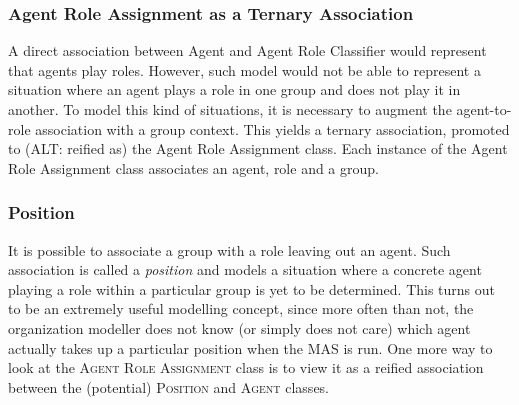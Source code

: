 \subsubsection*{Agent Role Assignment as a Ternary Association}

A direct association between Agent and Agent Role Classifier would represent that agents play roles.
However, such model would not be able to represent a situation where an agent plays a role in one group and does not play it in another.
To model this kind of situations, it is necessary to augment the agent-to-role association with a group context.
This yields a ternary association, promoted to (ALT: reified as) the Agent Role Assignment class.
Each instance of the Agent Role Assignment class associates an agent, role and a group.

\subsubsection*{Position}

It is possible to associate a group with a role leaving out an agent.
Such association is called a \textit{position} and models a situation where a concrete agent playing a role within a particular group is yet to be determined.
This turns out to be an extremely useful modelling concept, since more often than not, the organization modeller does not know (or simply does not care) which agent actually takes up a particular position when the MAS is run.
One more way to look at the \textsc{Agent Role Assignment} class is to view it as a reified association between the (potential) \textsc{Position} and \textsc{Agent} classes.